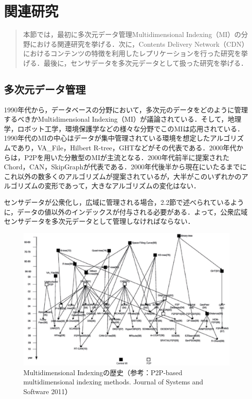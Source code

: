 \chapter{関連研究}
\begin{large}
\begin{quote}
本節では，最初に多次元データ管理Multidimensional Indexing（MI）の分野における関連研究を挙げる．次に，Contents Delivery Network（CDN）におけるコンテンツの特徴を利用したレプリケーションを行った研究を挙げる．最後に，センサデータを多次元データとして扱った研究を挙げる．
\end{quote}
\end{large}
\clearpage

\section{多次元データ管理}
1990年代から，データベースの分野において，多次元のデータをどのように管理するべきかMultidimensional Indexing（MI）\cite{Gaede:1998:MAM:280277.280279}が議論されている．そして，地理学，ロボット工学，環境保護学などの様々な分野でこのMIは応用されている．1990年代のMIの中心はデータが集中管理されている環境を想定したアルゴリズムであり，VA\_File\cite{Weber:1998:QAP:645924.671192}，Hilbert R-tree\cite{Kamel:1994:HRI:645920.673001}，GHT\cite{Ratnasamy:2002:GGH:570738.570750}などがその代表である．2000年代からは，P2Pを用いた分散型のMIが主流となる．2000年代前半に提案されたChord\cite{Stoica:2001:CSP:383059.383071}，CAN\cite{Ratnasamy:2001:SCN:383059.383072}，SkipGraph\cite{Aspnes:2003:SG:644108.644170}が代表である．2000年代後半から現在にいたるまでにこれ以外の数多くのアルゴリズムが提案されているが，大半がこのいずれかのアルゴリズムの変形であって，大きなアルゴリズムの変化はない．

センサデータが公衆化し，広域に管理される場合，2.2節で述べられているように，データの値以外のインデックスが付与される必要がある．よって，公衆広域センサデータを多次元データとして管理しなければならない．
\begin{figure}[htbp]
 \begin{center}
  \includegraphics[width=130mm]{./images/MI_history.eps}
 \end{center}
 \caption{Multidimensional Indexingの歴史（参考：P2P-based multidimensional indexing methods. Journal of Systems and Software 2011\cite{Zhang:2011:PMI:2039458.2039840}）}
 \label{fig:MI_history}
\end{figure}




